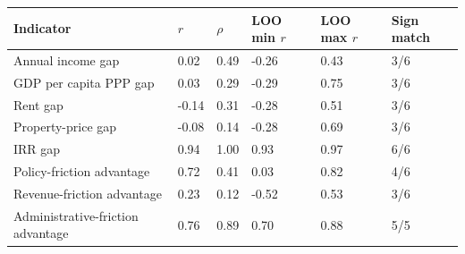 \begin{tabular}{@{}llllll@{}}\toprule
Indicator & $r$ & $\rho$ & LOO min $r$ & LOO max $r$ & Sign match \\
\midrule
Annual income gap & 0.02 & 0.49 & -0.26 & 0.43 & 3/6 \\
GDP per capita PPP gap & 0.03 & 0.29 & -0.29 & 0.75 & 3/6 \\
Rent gap & -0.14 & 0.31 & -0.28 & 0.51 & 3/6 \\
Property-price gap & -0.08 & 0.14 & -0.28 & 0.69 & 3/6 \\
IRR gap & 0.94 & 1.00 & 0.93 & 0.97 & 6/6 \\
Policy-friction advantage & 0.72 & 0.41 & 0.03 & 0.82 & 4/6 \\
Revenue-friction advantage & 0.23 & 0.12 & -0.52 & 0.53 & 3/6 \\
Administrative-friction advantage & 0.76 & 0.89 & 0.70 & 0.88 & 5/5 \\
\bottomrule
\end{tabular}
